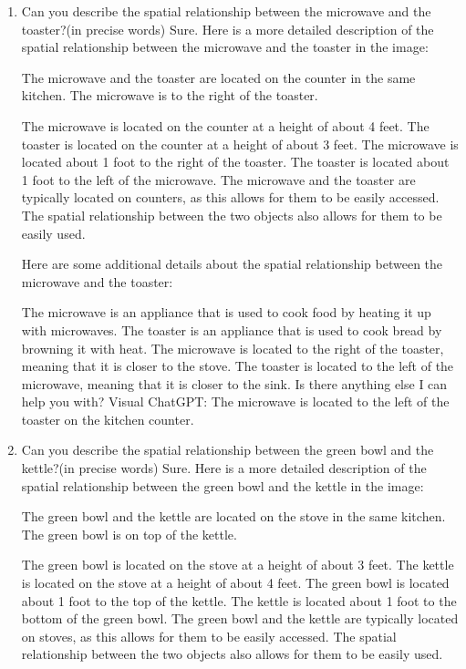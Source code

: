 \begin{enumerate}
    \item Can you describe the spatial relationship between the microwave and the toaster?(in precise words)
    \subitem 
    Sure. Here is a more detailed description of the spatial relationship between the microwave and the toaster in the image:
    
    The microwave and the toaster are located on the counter in the same kitchen. The microwave is to the right of the toaster.
    
    The microwave is located on the counter at a height of about 4 feet.
    The toaster is located on the counter at a height of about 3 feet.
    The microwave is located about 1 foot to the right of the toaster.
    The toaster is located about 1 foot to the left of the microwave.
    The microwave and the toaster are typically located on counters, as this allows for them to be easily accessed. The spatial relationship between the two objects also allows for them to be easily used.
    
    Here are some additional details about the spatial relationship between the microwave and the toaster:
    
    The microwave is an appliance that is used to cook food by heating it up with microwaves.
    The toaster is an appliance that is used to cook bread by browning it with heat.
    The microwave is located to the right of the toaster, meaning that it is closer to the stove.
    The toaster is located to the left of the microwave, meaning that it is closer to the sink.
    Is there anything else I can help you with?
    \subitem Visual ChatGPT: The microwave is located to the left of the toaster on the kitchen counter.
    \item Can you describe the spatial relationship between the green bowl and the kettle?(in precise words)
    \subitem 
    Sure. Here is a more detailed description of the spatial relationship between the green bowl and the kettle in the image:
    
    The green bowl and the kettle are located on the stove in the same kitchen. The green bowl is on top of the kettle.
    
    The green bowl is located on the stove at a height of about 3 feet.
    The kettle is located on the stove at a height of about 4 feet.
    The green bowl is located about 1 foot to the top of the kettle.
    The kettle is located about 1 foot to the bottom of the green bowl.
    The green bowl and the kettle are typically located on stoves, as this allows for them to be easily accessed. The spatial relationship between the two objects also allows for them to be easily used.
    

\end{enumerate}
